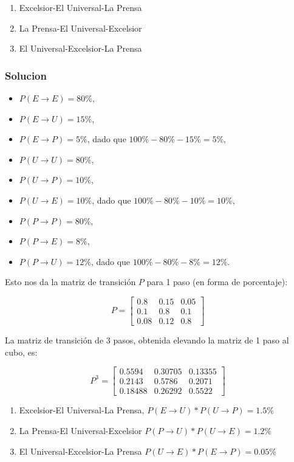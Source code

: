 \documentclass{article}
\begin{document}
\begin{enumerate}
    \item Excelsior-El Universal-La Prensa
    \item La Prensa-El Universal-Excelsior
    \item El Universal-Excelsior-La Prensa
\end{enumerate}

\subsubsection*{Solucion}

\begin{itemize}
    \item $P(E \rightarrow E) = 80\%$,
    \item $P(E \rightarrow U) = 15\%$,
    \item $P(E \rightarrow P) = 5\%$, dado que $100\% - 80\% - 15\% = 5\%$,
    \item $P(U \rightarrow U) = 80\%$,
    \item $P(U \rightarrow P) = 10\%$,
    \item $P(U \rightarrow E) = 10\%$, dado que $100\% - 80\% - 10\% = 10\%$,
    \item $P(P \rightarrow P) = 80\%$,
    \item $P(P \rightarrow E) = 8\%$,
    \item $P(P \rightarrow U) = 12\%$, dado que $100\% - 80\% - 8\% = 12\%$.
\end{itemize}

Esto nos da la matriz de transición \(P\) para 1 paso (en forma de porcentaje):

\[ P = \begin{bmatrix} 0.8 & 0.15 & 0.05 \\ 0.1 & 0.8 & 0.1 \\ 0.08 & 0.12 & 0.8 \end{bmatrix} \]

La matriz de transición de 3 pasos, obtenida elevando la matriz de 1 paso al cubo, es:

\[ P^3 = \begin{bmatrix} 0.5594 & 0.30705 & 0.13355 \\ 0.2143 & 0.5786 & 0.2071 \\ 0.18488 & 0.26292 & 0.5522 \end{bmatrix} \]

\begin{enumerate}
    \item Excelsior-El Universal-La Prensa, $P(E \rightarrow U) * P(U \rightarrow P) = 1.5\%$
    \item La Prensa-El Universal-Excelsior $P(P \rightarrow U) * P(U \rightarrow E) = 1.2\%$
    \item El Universal-Excelsior-La Prensa $P(U \rightarrow E) * P(E \rightarrow P) = 0.05\%$
\end{enumerate}
\end{document}
